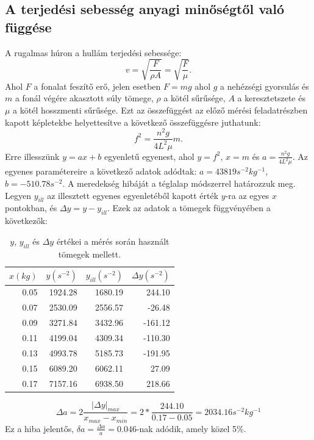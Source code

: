 \documentclass[10pt,pdftex]{report}
\begin{document}
\subsection*{A terjedési sebesség anyagi minőségtől való függése}
A rugalmas húron a hullám terjedési sebessége:
\begin{equation*}
    v=\sqrt{\frac{F}{\rho A}}=\sqrt{\frac{F}{\mu}}.
\end{equation*}
Ahol $F$ a fonalat feszítő erő, jelen esetben $F=mg$ ahol $g$ a nehézségi gyorsulás és $m$ a fonál végére akasztott súly tömege, $\rho$ a kötél sűrűsége, $A$ a keresztetszete és $\mu$ a kötél hosszmenti sűrűsége. Ezt az összefüggést az előző mérési feladatrészben kapott képletekbe helyettesítve a következő összefüggésre juthatunk:
\begin{equation*}
    f^2=\frac{n^2g}{4L^2\mu}m.
\end{equation*}
Erre illesszünk $y=ax+b$ egyenletű egyenest, ahol $y=f^2$, $x=m$ és $a=\frac{n^2g}{4L^2\mu}$. Az egyenes paramétereire a következő adatok adódtak: $a=43819s^{-2}kg^{-1}$, $b=-510.78s^{-2}$. A meredekség hibáját a téglalap módszerrel határozzuk meg. Legyen $y_{ill}$ az illesztett egyenes egyenletéből kapott érték $y$-ra az egyes $x$ pontokban, és $\Delta y=y-y_{ill}$. Ezek az adatok a tömegek függvényében a következők:
\begin{table}[H]
    \centering
    \begin{tabular}{|r|r|r|r|}
        \hline
        $x(kg)$ & $y(s^{-2})$ & $y_{ill}(s^{-2})$ & $\Delta y(s^{-2})$ \\
        \hline
        0.05 & 1924.28 & 1680.19 & 244.10 \\
        \hline
        0.07 & 2530.09 & 2556.57 & -26.48 \\
        \hline
        0.09 & 3271.84 & 3432.96 & -161.12 \\
        \hline
        0.11 & 4199.04 & 4309.34 & -110.30 \\
        \hline
        0.13 & 4993.78 & 5185.73 & -191.95 \\
        \hline
        0.15 & 6089.20 & 6062.11 & 27.09 \\
        \hline
        0.17 & 7157.16 & 6938.50 & 218.66 \\
        \hline
    \end{tabular}
    \caption{$y$, $y_{ill}$ és $\Delta y$ értékei a mérés során használt tömegek mellett.}
\end{table}
\begin{equation*}
    \Delta a = 2\frac{\left|\Delta y\right|_{max}}{x_{max}-x_{min}}=2*\frac{244.10}{0.17 - 0.05}=2034.16s^{-2}kg^{-1}
\end{equation*}
Ez a hiba jelentős, $\delta a = \frac{\Delta a}{a}=0.046$-nak adódik, amely közel 5\%. \newline
\end{document}
